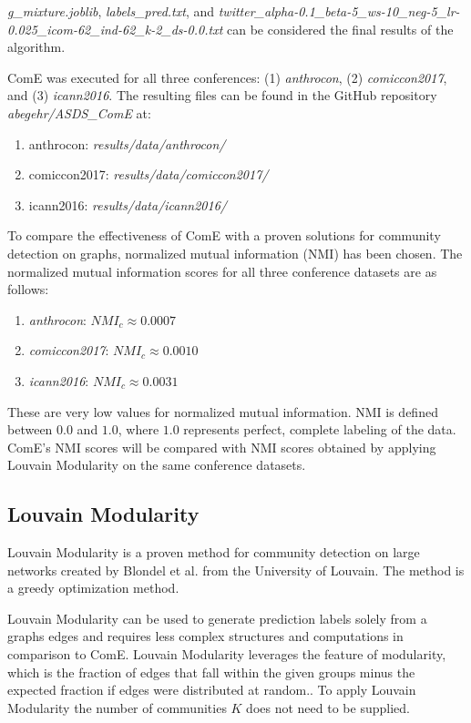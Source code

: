 \documentclass[sigconf]{acmart}
\begin{document}
\textit{g\_mixture.joblib}, \textit{labels\_pred.txt}, and \textit{twitter\_alpha-0.1\_beta-5\_ws-10\_neg-5\_lr-0.025\_icom-62\_ind-62\_k-2\_ds-0.0.txt} can be considered the final results of the algorithm.

ComE was executed for all three conferences: (1) \textit{anthrocon}, (2) \textit{comiccon2017}, and (3) \textit{icann2016}. The resulting files can be found in the GitHub repository \textit{abegehr/ASDS\_ComE}\cite{asds} at:
\begin{enumerate}
	\item anthrocon: \textit{results/data/anthrocon/}
	\item comiccon2017: \textit{results/data/comiccon2017/}
	\item icann2016: \textit{results/data/icann2016/}
\end{enumerate}

To compare the effectiveness of ComE with a proven solutions for community detection on graphs, normalized mutual information (NMI) has been chosen. The normalized mutual information scores for all three conference datasets are as follows:

\begin{enumerate}
	\item \textit{anthrocon}: $NMI_c \approx 0.0007$
	\item \textit{comiccon2017}: $NMI_c \approx 0.0010$
	\item \textit{icann2016}: $NMI_c \approx 0.0031$
\end{enumerate}

These are very low values for normalized mutual information. NMI is defined between $0.0$ and $1.0$, where $1.0$ represents perfect, complete labeling of the data. ComE's NMI scores will be compared with NMI scores obtained by applying Louvain Modularity on the same conference datasets.

\subsection{Louvain Modularity} \label{apply_lm}

Louvain Modularity is a proven method for community detection on large networks created by Blondel et al. from the University of Louvain. The method is a greedy optimization method. \cite{lou_mod}

Louvain Modularity can be used to generate prediction labels solely from a graphs edges and requires less complex structures and computations in comparison to ComE. Louvain Modularity leverages the feature of modularity, which is the fraction of edges that fall within the given groups minus the expected fraction if edges were distributed at random.\cite{mod}. To apply Louvain Modularity the number of communities $K$ does not need to be supplied.
\end{document}
